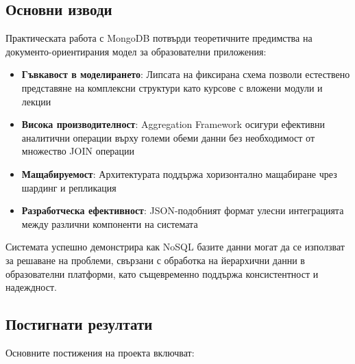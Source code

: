 \subsection{Основни изводи}

Практическата работа с MongoDB потвърди теоретичните предимства на документо-ориентирания модел за образователни приложения:

\begin{itemize}
    \item \textbf{Гъвкавост в моделирането}: Липсата на фиксирана схема позволи естествено представяне на комплексни структури като курсове с вложени модули и лекции

    \item \textbf{Висока производителност}: Aggregation Framework осигури ефективни аналитични операции върху големи обеми данни без необходимост от множество JOIN операции

    \item \textbf{Мащабируемост}: Архитектурата поддържа хоризонтално мащабиране чрез шардинг и репликация

    \item \textbf{Разработческа ефективност}: JSON-подобният формат улесни интеграцията между различни компоненти на системата
\end{itemize}

Системата успешно демонстрира как NoSQL базите данни могат да се използват за решаване на проблеми, свързани с обработка на йерархични данни в образователни платформи, като същевременно поддържа консистентност и надеждност.

\subsection{Постигнати резултати}

Основните постижения на проекта включват:

